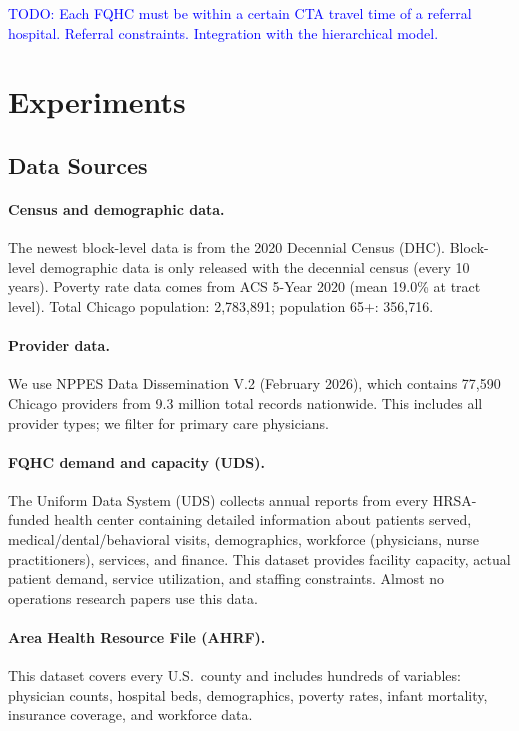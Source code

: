 \documentclass[11pt]{article}
\begin{document}
\textcolor{blue}{TODO: Each FQHC must be within a certain CTA travel time of a referral hospital. Referral constraints. Integration with the hierarchical model.}



\section{Experiments}\label{sec:experiments}

\subsection{Data Sources}

\paragraph{Census and demographic data.}
The newest block-level data is from the 2020 Decennial Census (DHC). Block-level demographic data is only released with the 
decennial census (every 10 years). Poverty rate data comes from ACS 5-Year 2020 (mean 19.0\% at tract level). Total Chicago 
population: 2,783,891; population 65+: 356,716.

\paragraph{Provider data.}
We use NPPES Data Dissemination V.2 (February 2026), which contains 77,590 Chicago providers from 9.3 million total records nationwide. 
This includes all provider types; we filter for primary care physicians.

\paragraph{FQHC demand and capacity (UDS).}
The Uniform Data System (UDS) collects annual reports from every HRSA-funded health center containing detailed information about 
patients served, medical/dental/behavioral visits, demographics, workforce (physicians, nurse practitioners), services, and finance. 
This dataset provides facility capacity, actual patient demand, service utilization, and staffing constraints. Almost no operations 
research papers use this data.

\paragraph{Area Health Resource File (AHRF).}
This dataset covers every U.S.\ county and includes hundreds of variables: physician counts, hospital beds, demographics, poverty rates, 
infant mortality, insurance coverage, and workforce data.
\end{document}
